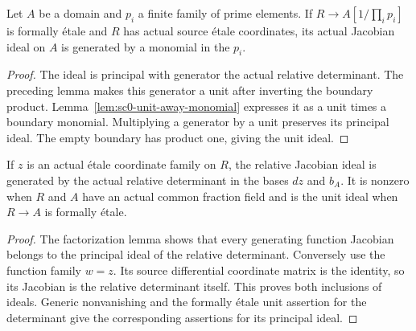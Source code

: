 \begin{lemma}\label{lem:sc0-relative-jacobian-prime-monomial}
\leanok
{}
Let $A$ be a domain and $p_i$ a finite family of prime elements. If
$R\to A[1/\prod_i p_i]$ is formally \'etale and $R$ has actual source \'etale
coordinates, its actual Jacobian ideal on $A$ is generated by a monomial in the
$p_i$.
\end{lemma}
\begin{proof}
The ideal is principal with generator the actual relative determinant. The
preceding lemma makes this generator a unit after inverting the boundary
product. Lemma~\ref{lem:sc0-unit-away-monomial} expresses it as a unit times a
boundary monomial. Multiplying a generator by a unit preserves its principal
ideal. The empty boundary has product one, giving the unit ideal.
\end{proof}

\begin{lemma}\label{lem:sc0-affine-jacobian-principal}
\leanok
{}
If $z$ is an actual \'etale coordinate family on $R$, the relative Jacobian ideal
is generated by the actual relative determinant in the bases $dz$ and $b_A$.
It is nonzero when $R$ and $A$ have an actual common fraction field and is the
unit ideal when $R\to A$ is formally \'etale.
\end{lemma}
\begin{proof}
The factorization lemma shows that every generating function Jacobian belongs to
the principal ideal of the relative determinant. Conversely use the function
family $w=z$. Its source differential coordinate matrix is the identity, so its
Jacobian is the relative determinant itself. This proves both inclusions of ideals.
Generic nonvanishing and the formally \'etale unit assertion for the determinant
give the corresponding assertions for its principal ideal.
\end{proof}
